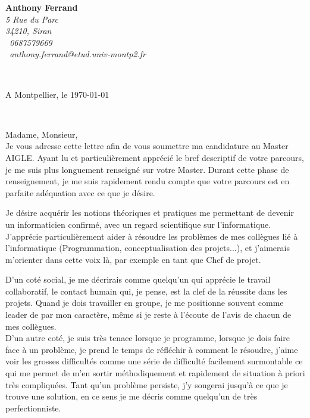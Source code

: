 \documentclass[11pt]{article}
\begin{document}
\sffamily
\hfill
%
\begin{minipage}[t]{.6\textwidth}
    \raggedleft
    {\bfseries Anthony Ferrand}\\[.35ex]
    \small\itshape
    5 Rue du Parc\\
    34210, Siran\\[.35ex]
    \Telefon~0687579669\\
    \Letter~anthony.ferrand@etud.univ-montp2.fr
\end{minipage}\\
%
\hfill
%
\begin{minipage}[t]{.4\textwidth}
    \raggedleft
    A Montpellier, le \today
\end{minipage}\\[2em]
%
\raggedright
Madame, Monsieur,\\[1em]

Je vous adresse cette lettre afin de vous soumettre ma candidature au Master AIGLE. Ayant lu et particulièrement apprécié le bref descriptif de votre parcours, je me suis plus longuement renseigné sur votre Master. Durant cette phase de renseignement, je me suis rapidement rendu compte que votre parcours est en parfaite adéquation avec ce que je désire. 

Je désire acquérir les notions théoriques et pratiques me permettant de devenir un informaticien confirmé, avec un regard scientifique sur l'informatique. J'apprécie particulièrement aider à résoudre les problèmes de mes collègues lié à l'informatique (Programmation, conceptualisation des projets...), et j'aimerais m'orienter dans cette voix là, par exemple en tant que Chef de projet.

D'un coté social, je me décrirais comme quelqu'un qui apprécie le travail collaboratif, le contact humain qui, je pense, est la clef de la réussite dans les projets. Quand je dois travailler en groupe, je me positionne souvent comme leader de par mon caractère, même si je reste à l'écoute de l'avis de chacun de mes collègues.\\
D'un autre coté, je suis très tenace lorsque je programme, lorsque je dois faire face à un problème, je prend le temps de réfléchir à comment le résoudre, j'aime voir les grosses difficultés comme une série de difficulté facilement surmontable ce qui me permet de m'en sortir méthodiquement et rapidement de situation à priori très compliquées. Tant qu'un problème persiste, j'y songerai jusqu'à ce que je trouve une solution, en ce sens je me décris comme quelqu'un de très perfectionniste.
\end{document}

